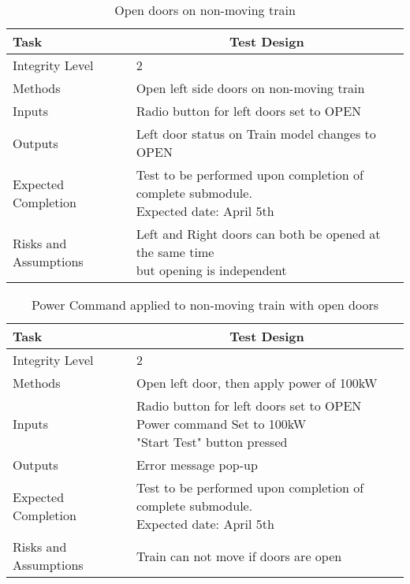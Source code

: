 \documentclass[]{article}
\begin{document}
	\begin{table}[H]
		\centering
		\caption{Open doors on non-moving train}
		\begin{tabular}{|l|l|}
			\hline
			Task & \multicolumn{1}{c|}{Test Design} \\ \hline
			Integrity Level & 2 \\ \hline
			Methods & Open left side doors on non-moving train  \\ \hline
			Inputs &  Radio button for left doors set to OPEN \\ \hline
			Outputs & Left door status on Train model changes to OPEN\\ \hline
			Expected Completion & \parbox[t]{10cm}{Test to be performed upon completion of complete submodule.\\ Expected date: April 5th}\\ \hline
			Risks and Assumptions &\parbox[t]{10cm}{ Left and Right doors can both be opened at the same time \\ but opening is independent}\\ \hline
		\end{tabular}
	\end{table}

	\begin{table}[H]
		\centering
		\caption{Power Command applied to non-moving train with open doors}
		\begin{tabular}{|l|l|}
			\hline
			Task & \multicolumn{1}{c|}{Test Design} \\ \hline
			Integrity Level & 2 \\ \hline
			Methods & Open left door, then apply power of 100kW  \\ \hline
			Inputs &  \parbox[t]{10cm}{Radio button for left doors set to OPEN\\ Power command Set to 100kW\\ "Start Test" button pressed }\\ \hline
			Outputs & Error message pop-up\\ \hline
			Expected Completion & \parbox[t]{10cm}{Test to be performed upon completion of complete submodule.\\ Expected date: April 5th}\\ \hline
			Risks and Assumptions & Train can not move if doors are open\\ \hline
		\end{tabular}
	\end{table}
\end{document}
